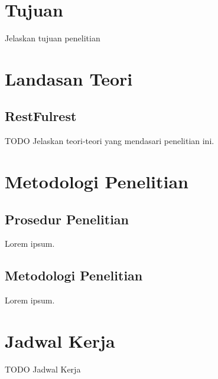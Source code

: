 \documentclass[a4paper, 12pt]{report}
\begin{document}
\section*{Tujuan}
\begin{flushleft}
Jelaskan tujuan penelitian
\end{flushleft}

\section*{Landasan Teori}
\subsection*{RestFulrest}
\begin{flushleft}
TODO Jelaskan teori-teori yang mendasari penelitian ini.
\end{flushleft}

\section*{Metodologi Penelitian}

\subsection*{Prosedur Penelitian}
\begin{flushleft}
Lorem ipsum.
\end{flushleft}

\subsection*{Metodologi Penelitian}
\begin{flushleft}
Lorem ipsum.
\end{flushleft}

\section*{Jadwal Kerja}
\begin{flushleft}
TODO Jadwal Kerja
\end{flushleft}
\end{document}
